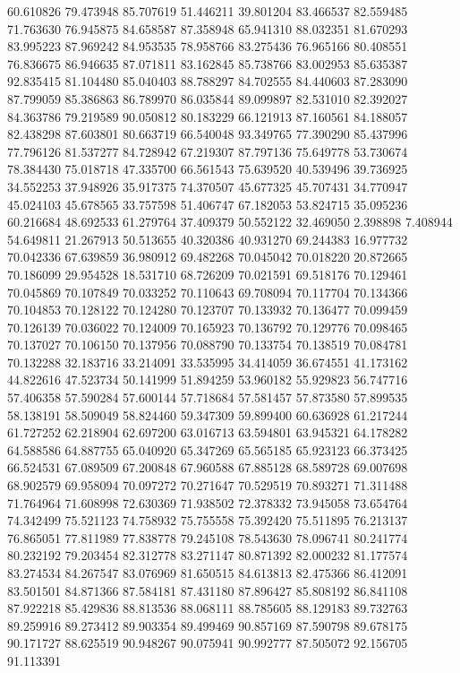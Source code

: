 60.610826
79.473948
85.707619
51.446211
39.801204
83.466537
82.559485
71.763630
76.945875
84.658587
87.358948
65.941310
88.032351
81.670293
83.995223
87.969242
84.953535
78.958766
83.275436
76.965166
80.408551
76.836675
86.946635
87.071811
83.162845
85.738766
83.002953
85.635387
92.835415
81.104480
85.040403
88.788297
84.702555
84.440603
87.283090
87.799059
85.386863
86.789970
86.035844
89.099897
82.531010
82.392027
84.363786
79.219589
90.050812
80.183229
66.121913
87.160561
84.188057
82.438298
87.603801
80.663719
66.540048
93.349765
77.390290
85.437996
77.796126
81.537277
84.728942
67.219307
87.797136
75.649778
53.730674
78.384430
75.018718
47.335700
66.561543
75.639520
40.539496
39.736925
34.552253
37.948926
35.917375
74.370507
45.677325
45.707431
34.770947
45.024103
45.678565
33.757598
51.406747
67.182053
53.824715
35.095236
60.216684
48.692533
61.279764
37.409379
50.552122
32.469050
2.398898
7.408944
54.649811
21.267913
50.513655
40.320386
40.931270
69.244383
16.977732
70.042336
67.639859
36.980912
69.482268
70.045042
70.018220
20.872665
70.186099
29.954528
18.531710
68.726209
70.021591
69.518176
70.129461
70.045869
70.107849
70.033252
70.110643
69.708094
70.117704
70.134366
70.104853
70.128122
70.124280
70.123707
70.133932
70.136477
70.099459
70.126139
70.036022
70.124009
70.165923
70.136792
70.129776
70.098465
70.137027
70.106150
70.137956
70.088790
70.133754
70.138519
70.084781
70.132288
32.183716
33.214091
33.535995
34.414059
36.674551
41.173162
44.822616
47.523734
50.141999
51.894259
53.960182
55.929823
56.747716
57.406358
57.590284
57.600144
57.718684
57.581457
57.873580
57.899535
58.138191
58.509049
58.824460
59.347309
59.899400
60.636928
61.217244
61.727252
62.218904
62.697200
63.016713
63.594801
63.945321
64.178282
64.588586
64.887755
65.040920
65.347269
65.565185
65.923123
66.373425
66.524531
67.089509
67.200848
67.960588
67.885128
68.589728
69.007698
68.902579
69.958094
70.097272
70.271647
70.529519
70.893271
71.311488
71.764964
71.608998
72.630369
71.938502
72.378332
73.945058
73.654764
74.342499
75.521123
74.758932
75.755558
75.392420
75.511895
76.213137
76.865051
77.811989
77.838778
79.245108
78.543630
78.096741
80.241774
80.232192
79.203454
82.312778
83.271147
80.871392
82.000232
81.177574
83.274534
84.267547
83.076969
81.650515
84.613813
82.475366
86.412091
83.501501
84.871366
87.584181
87.431180
87.896427
85.808192
86.841108
87.922218
85.429836
88.813536
88.068111
88.785605
88.129183
89.732763
89.259916
89.273412
89.903354
89.499469
90.857169
87.590798
89.678175
90.171727
88.625519
90.948267
90.075941
90.992777
87.505072
92.156705
91.113391
